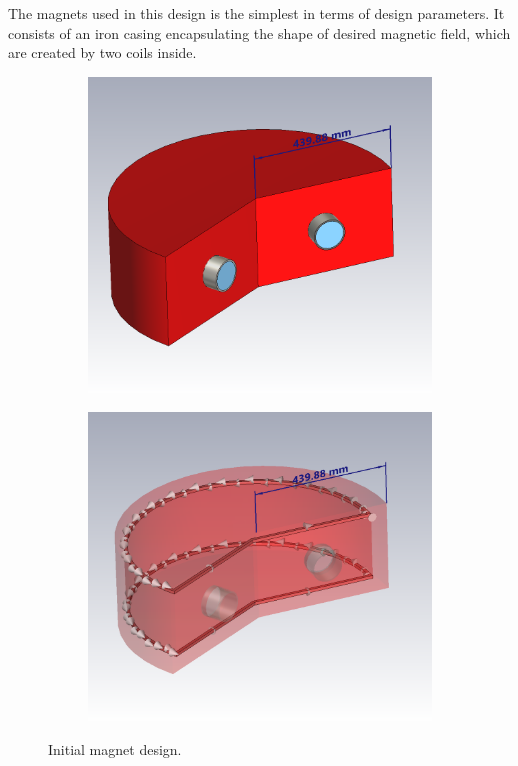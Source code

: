\documentclass[a4paper,oneside,12pt]{report}
\numberwithin{equation}{chapter}
\begin{document}
The magnets used in this design is the simplest in terms of design parameters. It consists of an iron casing encapsulating the shape of desired magnetic field, which are created by two coils inside.
\begin{figure}[H]
    \captionsetup[subfigure]{justification=centering}
    \captionsetup{justification=centering}
    \centering
    \begin{subfigure}{.5\textwidth}
      \centering
      \includegraphics[width=.9\linewidth]{./figures/cst/cst_first_magnet_design1.png}
    \end{subfigure}%
    \centering
    \begin{subfigure}{.5\textwidth}
      \centering
      \includegraphics[width=.92\linewidth]{./figures/cst/cst_first_magnet_design2.png}
    \end{subfigure}
    \caption{Initial magnet design.}
    \label{fig:initial_magnet_design}
\end{figure}
\end{document}
